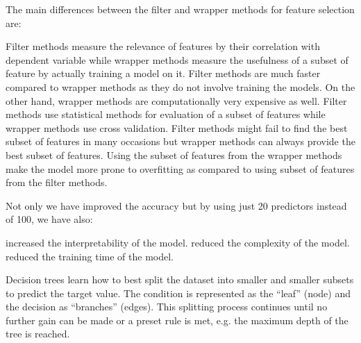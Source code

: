 \documentclass[preprint,12pt]{elsarticle}
\begin{document}
The main differences between the filter and wrapper methods for feature selection are:

    Filter methods measure the relevance of features by their correlation with dependent variable while wrapper methods measure the usefulness of a subset of feature by actually training a model on it.
    Filter methods are much faster compared to wrapper methods as they do not involve training the models. On the other hand, wrapper methods are computationally very expensive as well.
    Filter methods use statistical methods for evaluation of a subset of features while wrapper methods use cross validation.
    Filter methods might fail to find the best subset of features in many occasions but wrapper methods can always provide the best subset of features.
    Using the subset of features from the wrapper methods make the model more prone to overfitting as compared to using subset of features from the filter methods.

Not only we have improved the accuracy but by using just 20 predictors instead of 100, we have also:

    increased the interpretability of the model.
    reduced the complexity of the model.
    reduced the training time of the model.

Decision trees learn how to best split the dataset into smaller and smaller subsets to predict the target value. The condition is represented as the “leaf” (node) and the decision as “branches” (edges). This splitting process continues until no further gain can be made or a preset rule is met, e.g. the maximum depth of the tree is reached.


 
\end{document}
